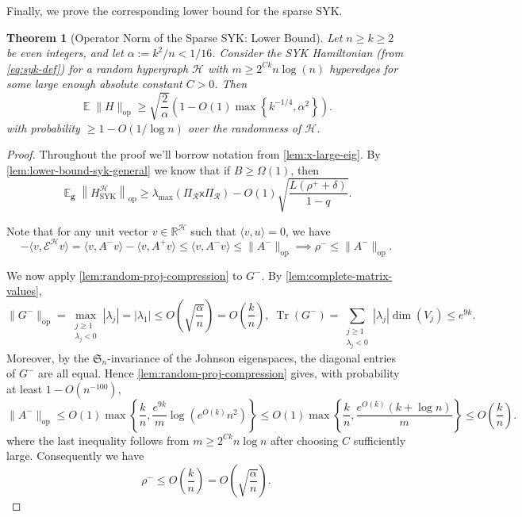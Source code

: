 \documentclass
[11pt,letterpaper]
{article}
\newtheorem{theorem}{Theorem}[section]
\theoremstyle{definition}
\newcommand{\Tr}{\operatorname{Tr}}
\newcommand{\sfx}{\mathsf x}
\newcommand{\R}{{\mathbb R}}
\newcommand{\1}{\mathbf{1}}
\newcommand{\cH}{\mathcal H}
\DeclareMathOperator*{\E}{\mathbb{E}}
\newcommand{\cR}{\mathcal R}
\renewcommand{\geq}{\geqslant}
\renewcommand{\leq}{\leqslant}
\begin{document}
Finally, we prove the corresponding lower bound for the sparse SYK.
\begin{theorem}[Operator Norm of the Sparse SYK: Lower Bound]\label{thm:syk-spectral-norm-lower-random}
    Let $n\geq k\geq 2$ be even integers, and let $\alpha:= k^2/n < 1/16$. Consider the SYK Hamiltonian (from \cref{eq:syk-def}) for a random hypergraph $\cH$ with $m\geq 2^{Ck}n\log(n)$ hyperedges for some large enough absolute constant $C > 0$. Then 
    \[\E\|H\|_{\operatorname{op}}\geq
\sqrt{\frac2\alpha}
\left(
1-O(1)\max\left\{
k^{-1/4},
\alpha^2
\right\}
\right).\]
with probability $\geq 1-O(1/\log n)$ over the randomness of $\cH$.
\end{theorem}
\begin{proof}
Throughout the proof we'll borrow notation from \cref{lem:x-large-eig}. By \cref{lem:lower-bound-syk-general} we know that if $B\geq\Omega(1)$, then
\begin{equation}
\label{eq:random-lower-transfer}
\E_{\bm g}\left\|H^\cH_{\operatorname{SYK}}\right\|_{\operatorname{op}}\geq\lambda_{\max}\!\left(\Pi_\cR\sfx\Pi_\cR\right)-O(1)\sqrt{\frac{L(\rho^++\delta)}{1-q}}.
\end{equation}

Note that for any unit vector $v\in\R^\cH$ such that $\langle v, u\rangle = 0$, we have
\begin{equation*}
-\langle v,\mathcal E^\cH v\rangle = \langle v,A^-v\rangle-\langle v,A^+v\rangle \leq \langle v,A^-v\rangle \leq \|A^-\|_{\operatorname{op}}\implies\rho^-\leq \|A^-\|_{\operatorname{op}}.
\end{equation*}

We now apply \cref{lem:random-proj-compression} to $G^-$. By
\cref{lem:complete-matrix-values},
\[\|G^-\|_{\operatorname{op}} = \max_{\substack{j\geq1\\\lambda_j<0}}|\lambda_j| = |\lambda_1| \leq O\left(\sqrt{\frac{\alpha}{n}}\right) = O\left(\frac{k}{n}\right),\;\Tr(G^-) = \sum_{\substack{j\geq1\\\lambda_j<0}}|\lambda_j|\dim(V_j)\leq e^{9k}.\]
Moreover, by the $\mathfrak{S}_n$-invariance of the Johnson eigenspaces,
the diagonal entries of $G^-$ are all equal. Hence
\cref{lem:random-proj-compression} gives, with probability at least
$1-O(n^{-100})$,
\[\|A^-\|_{\operatorname{op}}\leq O(1)\max\left\{\frac{k}{n}, \frac{e^{9k}}{m}\log\left(e^{O(k)}n^2\right)\right\}\leq O(1)\max\left\{\frac{k}{n}, \frac{e^{O(k)}(k+\log n)}{m}\right\}\leq O\left(\frac{k}{n}\right).\]
where the last inequality follows from
$m\geq2^{Ck}n\log n$ after choosing $C$ sufficiently large. Consequently we have
\[\rho^-\leq O\left(\frac{k}{n}\right) = O\left(\sqrt{\frac{\alpha}{n}}\right).\]


\end{proof}
\end{document}
